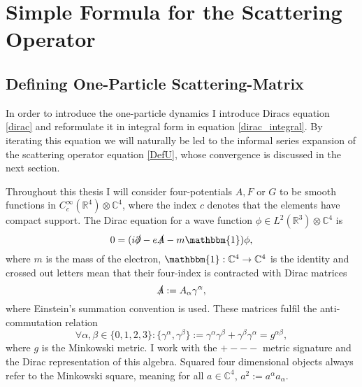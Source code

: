\documentclass[b5paper,draft,openbib,12pt]{memoir}
\newcommand{\id}{\mathbbm{1}}
\begin{document}
\section{Simple Formula for the Scattering Operator}

\subsection{Defining One-Particle Scattering-Matrix}\label{sec:one-particle}


In order to introduce the one-particle dynamics I introduce Diracs 
equation \eqref{dirac} and reformulate it in integral form in 
equation \eqref{dirac_integral}. By iterating this equation we 
will naturally be led to the informal series expansion of the 
scattering operator equation \eqref{DefU}, whose convergence is 
discussed in the next section. 

Throughout this thesis I will consider four-potentials $A, F$ or \(G\) to be smooth functions
in \(C_{c}^\infty(\mathbb{R}^4)\otimes \mathbb{C}^4\), where the index \(c\)
denotes that the elements have compact support. The Dirac
equation for a wave function \(\phi \in L^2(\mathbb{R}^3)\otimes \mathbb{C}^4\)
is
\begin{equation}\label{dirac}
0= (i\slashed{\partial}-e\slashed{A}-m \id) \phi,
\end{equation}
where \(m\) is the mass of the electron, 
\(\id: \mathbb{C}^4\rightarrow \mathbb{C}^4\) is the identity  and 
crossed out letters mean that their four-index is contracted with 
Dirac matrices
\begin{equation}
\slashed{A}:= A_\alpha \gamma^\alpha,
\end{equation}
where Einstein's summation convention is used. These matrices fulfil the anti-commutation relation
\begin{equation}
\forall \alpha, \beta \in \{0,1,2,3\}:\{\gamma^\alpha, \gamma^\beta\}:= \gamma^\alpha \gamma^\beta+ \gamma^\beta \gamma^\alpha= g^{\alpha \beta},
\end{equation}
where \(g\) is the Minkowski metric. I work with the \(+---\) metric signature and the Dirac representation of this algebra. Squared four dimensional objects always refer to the Minkowski square, meaning for all \(a\in \mathbb{C}^4\), \(a^2:= a^{\alpha} a_{\alpha}\). 
\end{document}
